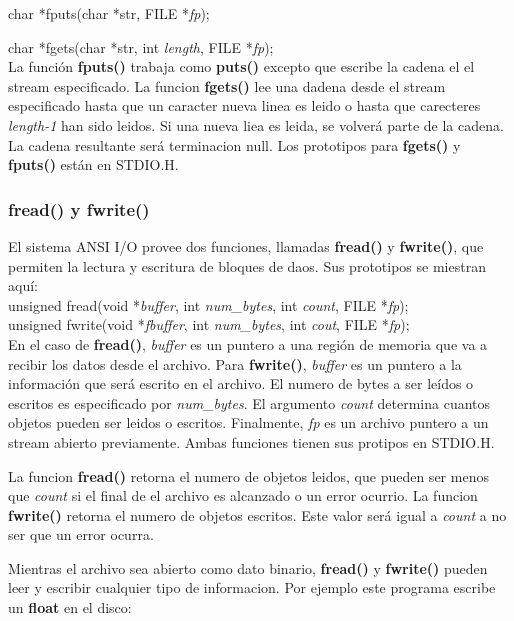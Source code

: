 \documentclass[]{article}
\begin{document}
	char *fputs(char *str, FILE *\textit{fp});
	
	char *fgets(char *str, int \textit{length}, FILE *\textit{fp});\\
	
	La función \textbf{fputs()} trabaja como \textbf{puts()} excepto que escribe la cadena el el stream especificado. La funcion \textbf{fgets()} lee una dadena desde el stream especificado hasta que un caracter nueva linea es leido o hasta que carecteres \textit{length-1} han sido leidos. Si una nueva liea es leida, se volverá parte de la cadena. La cadena resultante será terminacion null.
	Los prototipos para \textbf{fgets()} y \textbf{fputs()} están en STDIO.H.
	
	\subsubsection{fread() y fwrite()}
	
	El sistema ANSI I/O provee dos funciones, llamadas \textbf{fread()} y \textbf{fwrite()}, que permiten la lectura y escritura de bloques de daos. Sus prototipos se miestran aquí:\\
	
	unsigned fread(void *\textit{buffer}, int \textit{num\_bytes}, int \textit{count}, FILE *\textit{fp});\\
	
	unsigned fwrite(void *\textit{fbuffer}, int \textit{num\_bytes}, int \textit{cout}, FILE *\textit{fp});\\
	
	En el caso de \textbf{fread()}, \textit{buffer} es un puntero a una región de memoria que va a recibir los datos desde el archivo. Para \textbf{fwrite()}, \textit{buffer} es un puntero a la información que será escrito en  el archivo. El numero de bytes a ser leídos o escritos es especificado por \textit{num\_bytes}. El argumento \textit{count} determina cuantos objetos pueden ser leidos o escritos. Finalmente, \textit{fp} es un archivo puntero a un stream abierto previamente. Ambas funciones tienen sus protipos en STDIO.H.
	
	La funcion \textbf{fread()} retorna el numero de objetos leidos, que pueden ser menos que \textit{count} si el final de el archivo es alcanzado o un error ocurrio. La funcion \textbf{fwrite()} retorna el numero de objetos escritos. Este valor será igual a \textit{count} a no ser que un error ocurra.
	 
	Mientras el archivo sea abierto como dato binario, \textbf{fread()} y \textbf{fwrite()} pueden leer y escribir cualquier tipo de informacion. Por ejemplo este programa escribe un \textbf{float} en el disco:\\
	 
\end{document}
